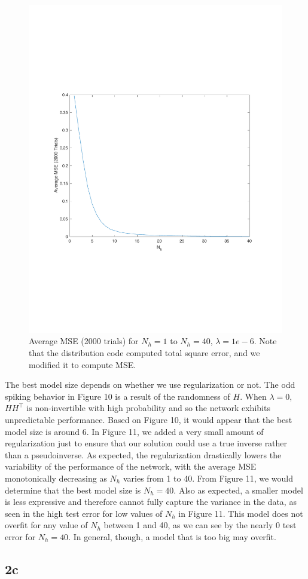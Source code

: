 \documentclass[]{article}
\begin{document}
\begin{figure}[H]
    \centering
    \includegraphics[width=0.55\linewidth]{problem2bReg1e-6.pdf}
    \caption{Average MSE (2000 trials) for $N_h=1$ to $N_h=40$, $\lambda=1e-6$. Note that the distribution code computed total square error, and we modified it to compute MSE.}
    \label{fig:my_label}
\end{figure}

The best model size depends on whether we use regularization or not. The odd spiking behavior in Figure 10 is a result of the randomness of $H$. When $\lambda=0$, $HH^\top$ is non-invertible with high probability and so the network exhibits unpredictable performance. Based on Figure 10, it would appear that the best model size is around 6. In Figure 11, we added a very small amount of regularization just to ensure that our solution could use a true inverse rather than a pseudoinverse. As expected, the regularization drastically lowers the variability of the performance of the network, with the average MSE monotonically decreasing as $N_h$ varies from 1 to 40. From Figure 11, we would determine that the best model size is $N_h=40$. Also as expected, a smaller model is less expressive and therefore cannot fully capture the variance in the data, as seen in the high test error for low values of $N_h$ in Figure 11. This model does not overfit for any value of $N_h$ between 1 and 40, as we can see by the nearly 0 test error for $N_h=40$. In general, though, a model that is too big may overfit.

\subsection*{2c}
\end{document}
